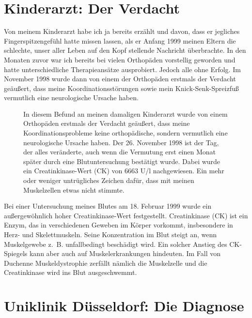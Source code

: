 \documentclass[fontsize=14pt,a4paper,headinclude,DIV=calc,automark]{scrbook}
\begin{document}
\section{Kinderarzt: Der Verdacht}

Von meinem Kinderarzt habe ich ja bereits erzählt und davon, dass er jegliches Fingerspitzengefühl hatte missen lassen, als er Anfang 1999 meinen Eltern die schlechte, unser aller Leben auf den Kopf stellende Nachricht überbrachte. In den Monaten zuvor war ich bereits bei vielen Orthopäden vorstellig geworden und hatte unterschiedliche Therapieansätze ausprobiert. Jedoch alle ohne Erfolg. Im November 1998 wurde dann von einem der Orthopäden erstmals der Verdacht geäußert, dass meine Koordinationsstörungen sowie mein Knick-Senk-Spreizfuß vermutlich eine neurologische Ursache haben.

\setlength{\fboxsep}{0pt}    %
\setlength{\fboxrule}{0.2pt} %
\begin{figure}[H]
    \centering
    \caption{In diesem Befund an meinen damaligen Kinderarzt wurde von einem Orthopäden erstmals der Verdacht geäußert, dass meine Koordinationsprobleme keine orthopädische, sondern vermutlich eine neurologische Ursache haben. Der 26. November 1998 ist der Tag, der alles veränderte, auch wenn die Vermutung erst einen Monat später durch eine Blutuntersuchung bestätigt wurde. Dabei wurde ein Creatinkinase-Wert (CK) von 6663 U/l nachgewiesen. Ein mehr oder weniger untrügliches Zeichen dafür, dass mit meinen Muskelzellen etwas nicht stimmte.}
    \label{fig:befund}
\end{figure}

Bei einer Untersuchung meines Blutes am 18. Februar 1999 wurde ein außergewöhnlich hoher Creatinkinase-Wert festgestellt. Creatinkinase (CK) ist ein Enzym, das in verschiedenen Geweben im Körper vorkommt, insbesondere in Herz- und Skelettmuskeln. Seine Konzentration im Blut steigt an, wenn Muskelgewebe z.~B. unfallbedingt beschädigt wird. Ein solcher Anstieg des CK-Spiegels kann aber auch auf Muskelerkrankungen hindeuten. Im Fall von Duchenne Muskeldystrophie zerfällt nämlich die Muskelzelle und die Creatinkinase wird ins Blut ausgeschwemmt.

\section{Uniklinik Düsseldorf: Die Diagnose}
\label{sec:kontrolluntersuchungen}
\end{document}
